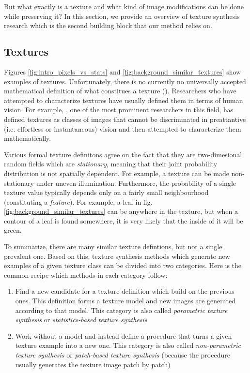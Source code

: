 But what exactly is a texture and what kind of image modifications can be done while preserving it? In this section, we provide an overview of texture synthesis research which is the second building block that our method relies on.

\subsection{Textures}
\label{section:background-texture_synthesis-textures}

Figures \ref{fig:intro_pixels_vs_stats} and \ref{fig:background_similar_textures} show examples of textures. Unfortunately, there is no currently no universally accepted mathematical definition of what constitues a texture (\citet{Raad2018}). Researchers who have attempted to characterize textures have usually defined them in terms of human vision. For example, \citet{Julesz1962}, one of the most prominent researchers in this field, has defined textures as classes of images that cannot be discriminated in preattantive (i.e. effortless or instantaneous) vision and then attempted to characterize them mathematically.

Various formal texture definitons agree on the fact that they are two-dimesional random fields which are \textit{stationary}, meaning that their joint probability distribution is not spatially dependent. For example, a texture can be made non-stationary under uneven illumination. Furthermore, the probability of a single texture value typically depends only on a fairly small neighbourhood (constituting a \textit{feature}). For example, a leaf in fig. \ref{fig:background_similar_textures} can be anywhere in the texture, but when a contour of a leaf is found somewhere, it is very likely that the inside of it will be green.

To summarize, there are many similar texture defintions, but not a single prevalent one. Based on this, texture synthesis methods which generate new examples of a given texture class can be divided into two categories. Here is the common recipe which methods in each category follow:

\begin{enumerate}
    \item Find a new candidate for a texture definition which build on the previous ones. This definition forms a texture model and new images are generated according to that model. This category is also called \textit{parametric texture synthesis} or \textit{statistics-based texture synthesis}
    \item Work without a model and instead define a procedure that turns a given texture example into a new one. This category is also called \textit{non-parametric texture synthesis} or \textit{patch-based texture synthesis} (because the procedure usually generates the texture image patch by patch)
\end{enumerate}

